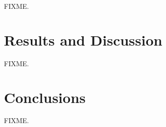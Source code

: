 \begin{doublespace}
FIXME.
\end{doublespace}

\section{Results and Discussion}

\begin{doublespace}
FIXME.
\end{doublespace}

\section{Conclusions}

\begin{doublespace}
FIXME.
\end{doublespace}




